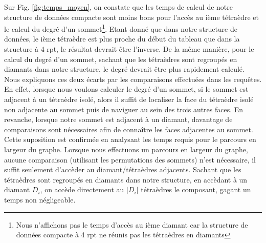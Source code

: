 Sur Fig. \ref{fig:temps_moyen}, on constate que les temps de calcul de notre structure de données compacte sont moins bons pour l'accès au ième tétraèdre et le calcul du degré d'un sommet\footnote{Nous n'affichons pas le temps d'accès au ième diamant car la structure de données compacte à 4 rpt ne réunis pas les tétraèdres en diamants}. Etant donné que dans notre structure de données, le ième tétraèdre est plus proche du début du tableau que dans la structure à 4 rpt, le résultat devrait être l'inverse. De la même manière, pour le calcul du degré d'un sommet, sachant que les tétraèdres sont regroupés en diamants dans notre structure, le degré devrait être plus rapidement calculé. Nous expliquons ces deux écarts par les comparaisons effectuées dans les requêtes. En effet, lorsque nous voulons calculer le degré d'un sommet, si le sommet est adjacent à un tétraèdre isolé, alors il suffit de localiser la face du tétraèdre isolé non adjacente au sommet puis de naviguer au sein des trois autres faces. En revanche, lorsque notre sommet est adjacent à un diamant, davantage de comparaisons sont nécessaires afin de connaître les faces adjacentes au sommet. Cette suposition est confirmée en analysant les temps requis pour le parcours en largeur du graphe. Lorsque nous effectuons un parcours en largeur du graphe, aucune comparaison (utilisant les permutations des sommets) n'est nécessaire, il suffit seulement d'accèder au diamant/tétraèdres adjacents. Sachant que les tétraèdres sont regroupés en diamants dans notre structure, en accèdant à un diamant $D_i$, on accède directement au $|D_i|$ tétraèdres le composant, gagant un temps non négligeable. 
